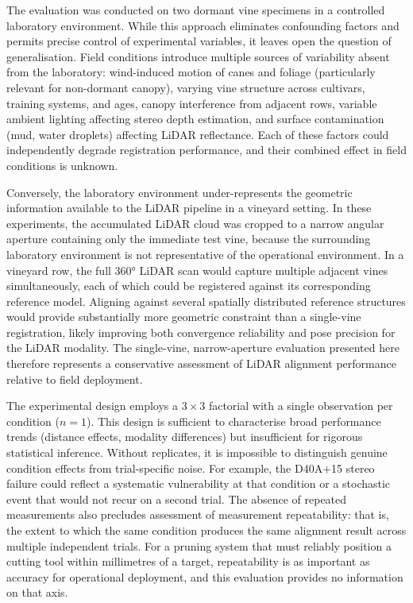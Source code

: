 The evaluation was conducted on two dormant vine specimens in a controlled laboratory environment. While this approach eliminates confounding factors and permits precise control of experimental variables, it leaves open the question of generalisation. Field conditions introduce multiple sources of variability absent from the laboratory: wind-induced motion of canes and foliage (particularly relevant for non-dormant canopy), varying vine structure across cultivars, training systems, and ages, canopy interference from adjacent rows, variable ambient lighting affecting stereo depth estimation, and surface contamination (mud, water droplets) affecting LiDAR reflectance. Each of these factors could independently degrade registration performance, and their combined effect in field conditions is unknown. 

Conversely, the laboratory environment under-represents the geometric information available to the LiDAR pipeline in a vineyard setting. In these experiments, the accumulated LiDAR cloud was cropped to a narrow angular aperture containing only the immediate test vine, because the surrounding laboratory environment is not representative of the operational environment. In a vineyard row, the full 360° LiDAR scan would capture multiple adjacent vines simultaneously, each of which could be registered against its corresponding reference model. Aligning against several spatially distributed reference structures would provide substantially more geometric constraint than a single-vine registration, likely improving both convergence reliability and pose precision for the LiDAR modality. The single-vine, narrow-aperture evaluation presented here therefore represents a conservative assessment of LiDAR alignment performance relative to field deployment.

The experimental design employs a $3 \times 3$ factorial with a single observation per condition ($n = 1$). This design is sufficient to characterise broad performance trends (distance effects, modality differences) but insufficient for rigorous statistical inference. Without replicates, it is impossible to distinguish genuine condition effects from trial-specific noise. For example, the D40A$+$15 stereo failure could reflect a systematic vulnerability at that condition or a stochastic event that would not recur on a second trial. The absence of repeated measurements also precludes assessment of measurement repeatability: that is, the extent to which the same condition produces the same alignment result across multiple independent trials. For a pruning system that must reliably position a cutting tool within millimetres of a target, repeatability is as important as accuracy for operational deployment, and this evaluation provides no information on that axis.

